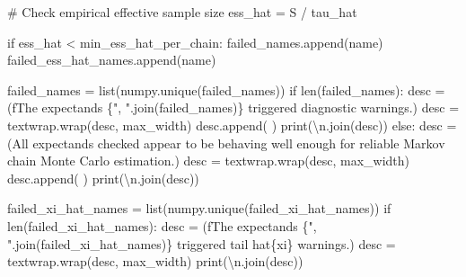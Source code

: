 \documentclass[
  letterpaper,
  DIV=11,
  numbers=noendperiod]{scrartcl}
\newenvironment{Shaded}{\begin{snugshade}}{\end{snugshade}}
\newcommand{\BuiltInTok}[1]{\textcolor[rgb]{0.00,0.23,0.31}{#1}}
\newcommand{\CharTok}[1]{\textcolor[rgb]{0.13,0.47,0.30}{#1}}
\newcommand{\CommentTok}[1]{\textcolor[rgb]{0.37,0.37,0.37}{#1}}
\newcommand{\ControlFlowTok}[1]{\textcolor[rgb]{0.00,0.23,0.31}{#1}}
\newcommand{\NormalTok}[1]{\textcolor[rgb]{0.00,0.23,0.31}{#1}}
\newcommand{\OperatorTok}[1]{\textcolor[rgb]{0.37,0.37,0.37}{#1}}
\newcommand{\SpecialCharTok}[1]{\textcolor[rgb]{0.37,0.37,0.37}{#1}}
\newcommand{\SpecialStringTok}[1]{\textcolor[rgb]{0.13,0.47,0.30}{#1}}
\newcommand{\StringTok}[1]{\textcolor[rgb]{0.13,0.47,0.30}{#1}}
\begin{document}
\begin{Shaded}
\begin{Highlighting}[]
      \CommentTok{\# Check empirical effective sample size}
\NormalTok{      ess\_hat }\OperatorTok{=}\NormalTok{ S }\OperatorTok{/}\NormalTok{ tau\_hat}
      
      \ControlFlowTok{if}\NormalTok{ ess\_hat }\OperatorTok{\textless{}}\NormalTok{ min\_ess\_hat\_per\_chain:}
\NormalTok{        failed\_names.append(name)}
\NormalTok{        failed\_ess\_hat\_names.append(name)}
  
\NormalTok{  failed\_names }\OperatorTok{=} \BuiltInTok{list}\NormalTok{(numpy.unique(failed\_names))}
  \ControlFlowTok{if} \BuiltInTok{len}\NormalTok{(failed\_names):}
\NormalTok{    desc }\OperatorTok{=}\NormalTok{ (}\SpecialStringTok{f\textquotesingle{}The expectands }\SpecialCharTok{\{}\StringTok{", "}\SpecialCharTok{.}\NormalTok{join(failed\_names)}\SpecialCharTok{\}}\SpecialStringTok{ \textquotesingle{}}
             \StringTok{\textquotesingle{}triggered diagnostic warnings.\textquotesingle{}}\NormalTok{)}
\NormalTok{    desc }\OperatorTok{=}\NormalTok{ textwrap.wrap(desc, max\_width)}
\NormalTok{    desc.append(}\StringTok{\textquotesingle{} \textquotesingle{}}\NormalTok{)}
    \BuiltInTok{print}\NormalTok{(}\StringTok{\textquotesingle{}}\CharTok{\textbackslash{}n}\StringTok{\textquotesingle{}}\NormalTok{.join(desc))}
  \ControlFlowTok{else}\NormalTok{:}
\NormalTok{    desc }\OperatorTok{=}\NormalTok{ (}\StringTok{\textquotesingle{}All expectands checked appear to be behaving well enough \textquotesingle{}}
            \StringTok{\textquotesingle{}for reliable Markov chain Monte Carlo estimation.\textquotesingle{}}\NormalTok{)}
\NormalTok{    desc }\OperatorTok{=}\NormalTok{ textwrap.wrap(desc, max\_width)}
\NormalTok{    desc.append(}\StringTok{\textquotesingle{} \textquotesingle{}}\NormalTok{)}
    \BuiltInTok{print}\NormalTok{(}\StringTok{\textquotesingle{}}\CharTok{\textbackslash{}n}\StringTok{\textquotesingle{}}\NormalTok{.join(desc))}
  
\NormalTok{  failed\_xi\_hat\_names }\OperatorTok{=} \BuiltInTok{list}\NormalTok{(numpy.unique(failed\_xi\_hat\_names))}
  \ControlFlowTok{if} \BuiltInTok{len}\NormalTok{(failed\_xi\_hat\_names):}
\NormalTok{    desc }\OperatorTok{=}\NormalTok{ (}\SpecialStringTok{f\textquotesingle{}The expectands }\SpecialCharTok{\{}\StringTok{", "}\SpecialCharTok{.}\NormalTok{join(failed\_xi\_hat\_names)}\SpecialCharTok{\}}\SpecialStringTok{ \textquotesingle{}}
             \StringTok{\textquotesingle{}triggered tail hat}\SpecialCharTok{\{xi\}}\StringTok{ warnings.\textquotesingle{}}\NormalTok{)}
\NormalTok{    desc }\OperatorTok{=}\NormalTok{ textwrap.wrap(desc, max\_width)}
    \BuiltInTok{print}\NormalTok{(}\StringTok{\textquotesingle{}}\CharTok{\textbackslash{}n}\StringTok{\textquotesingle{}}\NormalTok{.join(desc))}
    

\end{Highlighting}
\end{Shaded}
\end{document}

